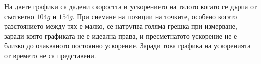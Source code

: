 \documentclass[aps, prb, twocolumn, a4paper, floatfix, reprint]{revtex4-2}
\begin{document}
На двете графики са дадени скоростта и ускорението на тялото когато се дърпа от съответно $104 g$ и $154 g$. При снемане на позиции на точките, особено когато разстоянието между тях е малко, се натрупва голяма грешка при измерване, заради която графиката не е идеална права, и пресметнатото ускорение не е близко до очакваното постоянно ускорение. Заради това графика на ускоренията от времето не са представени. 
\end{document}
